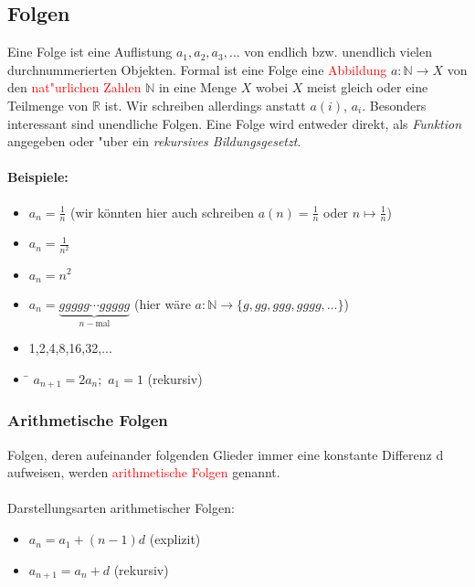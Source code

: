 \subsection{Folgen}
Eine Folge ist eine Auflistung $a_1,a_2,a_3, \ldots$ von endlich bzw. unendlich vielen durchnummerierten Objekten. Formal ist eine Folge eine \textcolor{red}{Abbildung} $a : \mathbb{N} \to X$ von den \textcolor{red}{nat"urlichen Zahlen} $\mathbb{N}$ in eine Menge $X$ wobei $X$ meist gleich oder eine Teilmenge von $\mathbb{R}$ ist. Wir schreiben allerdings anstatt $a(i)$, $a_i$. Besonders interessant sind unendliche Folgen. Eine Folge wird entweder direkt, als \textit{Funktion} angegeben oder "uber ein \textit{rekursives Bildungsgesetzt}.

\paragraph{Beispiele:}
\begin{itemize}
\item $a_n = \frac{1}{n}$ (wir könnten hier auch schreiben $a(n) = \frac{1}{n}$ oder $n \mapsto \frac{1}{n}$)
\item $a_n = \frac{1}{n^{2}}$
\item $a_n = n^{2}$
\item $a_n = \underbrace{ggggg \cdots ggggg}_{n-\text{mal}}$ (hier wäre $a: \mathbb{N} \to \{g, gg, ggg, gggg, \ldots\}$)
\item 1,2,4,8,16,32,...
\item \begin{tabbing} 
\hspace{3.5 cm}\=\hspace{5 cm}\kill 
$a_{n+1} = 2a_n;$ \>$a_1 = 1$ (rekursiv)
\end{tabbing}
\end{itemize}

\subsubsection{Arithmetische Folgen}
Folgen, deren aufeinander folgenden Glieder immer eine konstante Differenz d aufweisen, werden \textcolor{red}{arithmetische Folgen} genannt.\\\\
Darstellungsarten arithmetischer Folgen:
\begin{itemize}
\item $a_n = a_1 + (n-1)d$ (explizit)
\item $a_{n+1} = a_n + d$ (rekursiv)
\end{itemize}
